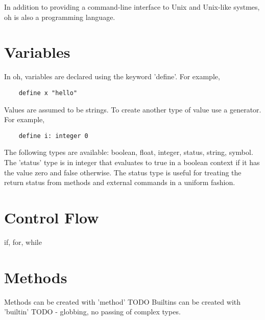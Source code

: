 \documentclass[12pt]{book}
\begin{document}
In addition to providing a command-line interface to Unix and
Unix-like systmes, oh is also a programming language.

\section{Variables}

In oh, variables are declared using the keyword 'define'. For example,

\begin{lstlisting}
	define x "hello"
\end{lstlisting}

Values are assumed to be strings. To create another type of value
use a generator. For example,

\begin{lstlisting}
	define i: integer 0
\end{lstlisting}

The following types are available: boolean, float, integer, status,
string, symbol. The 'status' type is in integer that evaluates to
true in a boolean context if it has the value zero and false
otherwise. The status type is useful for treating the return status
from methods and external commands in a uniform fashion.


\section{Control Flow}

if, for, while


\section{Methods}

Methods can be created with 'method' TODO
Builtins can be created with 'builtin' TODO - globbing, no passing
of complex types.



\end{document}
